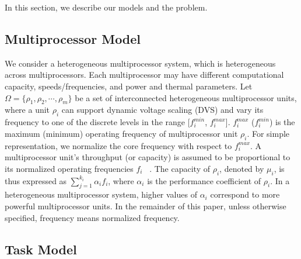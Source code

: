 \documentclass[conference]{IEEEtran}
\begin{document}
In this section, we describe our models and the problem.

\subsection{Multiprocessor Model}

We consider a heterogeneous multiprocessor system, which is heterogeneous across multiprocessors. Each multiprocessor may have different computational capacity, speeds/frequencies, and power and thermal parameters.
Let $\Omega = \{\rho_1, \rho_2,\cdots, \rho_m\}$ be a set of interconnected heterogeneous multiprocessor units, where
a unit $\rho_i$ can support dynamic voltage scaling (DVS) and vary its frequency to one of the discrete levels in the range
[$f^{min}_{i}$, $f^{max}_{i}$].
$f^{max}_{i}$ ($f^{min}_{i}$)  is the maximum (minimum) operating frequency of multiprocessor unit $\rho_i$.
For simple representation, we normalize the core frequency with respect to $f^{max}_{i}$.
A multiprocessor unit's throughput (or capacity) is assumed to be proportional to its normalized operating frequencies $f_{i}$ ~\cite{Leping10}. The capacity of $\rho_i$, denoted by $\mu_i$, is
thus expressed as $\sum_{j=1}^{k_i} \alpha_i f_{i}$,
where $\alpha_i$ is the performance coefficient of $\rho_i$.
In a heterogeneous multiprocessor system, higher values of $\alpha_i$ correspond to more powerful multiprocessor units.
In the remainder of this paper, unless otherwise specified, frequency means normalized frequency.


\subsection{Task Model}
\end{document}
